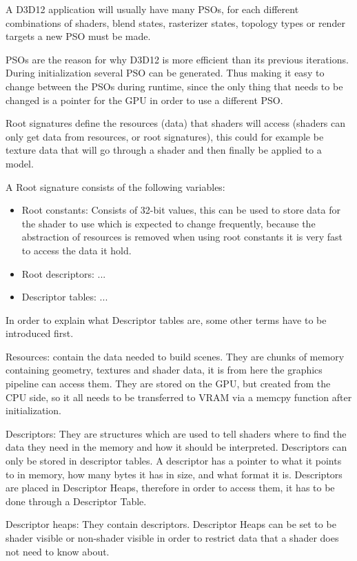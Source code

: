 A D3D12 application will usually have many \glspl{PSO}, for each different combinations of shaders, blend states, rasterizer states, topology types or render targets a new \gls{PSO} must be made.


\glspl{PSO} are the reason for why D3D12 is more efficient than its previous iterations. During initialization several \gls{PSO} can be generated.
Thus making it easy to change between the \glspl{PSO} during runtime, since the only thing that needs to be changed is a pointer for the \gls{GPU} in order to use a different \gls{PSO}. 

Root signatures define the resources (data) that shaders will access (shaders can only get data from resources, or root signatures), this could for example be texture data that will go through a shader and then finally be applied to a model. 


A Root signature consists of the following variables:
\begin{itemize}
\item Root constants:
Consists of 32-bit values, this can be used to store data for the shader to use which is expected to change frequently, because the abstraction of resources is removed when using root constants it is very fast to access the data it hold.
\item Root descriptors: ...
\item Descriptor tables: ... 
\end{itemize}

In order to explain what Descriptor tables are, some other terms have to be introduced first.


Resources: contain the data needed to build scenes.
They are chunks of memory containing geometry, textures and shader data, it is from here the graphics pipeline can access them.
They are stored on the \gls{GPU}, but created from the \gls{CPU} side, so it all needs to be transferred to VRAM via a memcpy function after initialization.

Descriptors: They are structures which are used to tell shaders where to find the data they need in the memory and how it should be interpreted.
Descriptors can only be stored in descriptor tables.
A descriptor has a pointer to what it points to in memory, how many bytes it has in size, and what format it is.
Descriptors are placed in Descriptor Heaps, therefore in order to access them, it has to be done through a Descriptor Table.


Descriptor heaps:
They contain descriptors.
Descriptor Heaps can be set to be shader visible or non-shader visible in order to restrict data that a shader does not need to know about. 


